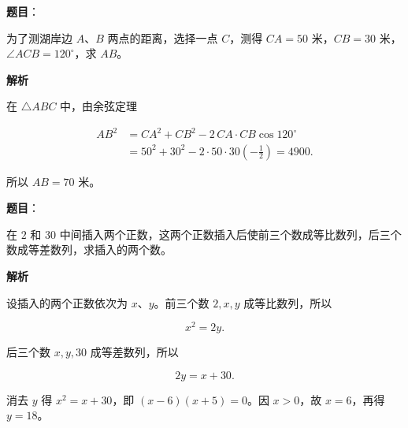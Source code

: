 \begin{answer}

\textbf{题目}：

为了测湖岸边 $A\text{、}B$ 两点的距离，选择一点 $C$，测得 $CA=50$ 米，$CB=30$ 米，$\angle ACB=120^\circ$，求 $AB$。

\textbf{解析}

在 $\triangle ABC$ 中，由余弦定理

\nopagebreak[4]
\[
\begin{aligned}
AB^2&=CA^2+CB^2-2\,CA\cdot CB\cos120^\circ\\
&=50^2+30^2-2\cdot50\cdot30\left(-\frac12\right)=4900.
\end{aligned}
\]

所以 $AB=70$ 米。


\end{answer}
\begin{answer}

\textbf{题目}：

在 $2$ 和 $30$ 中间插入两个正数，这两个正数插入后使前三个数成等比数列，后三个数成等差数列，求插入的两个数。

\textbf{解析}

设插入的两个正数依次为 $x\text{、}y$。前三个数 $2,x,y$ 成等比数列，所以

\nopagebreak[4]
\[
x^2=2y.
\]

后三个数 $x,y,30$ 成等差数列，所以

\nopagebreak[4]
\[
2y=x+30.
\]

消去 $y$ 得 $x^2=x+30$，即 $(x-6)(x+5)=0$。因 $x>0$，故 $x=6$，再得 $y=18$。


\end{answer}
